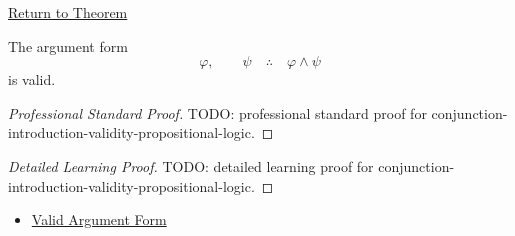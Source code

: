 \newpage
{}
\label{prf:conjunction-introduction-validity-propositional-logic}

\begin{remark*}[Return]
\hyperref[thm:conjunction-introduction-validity-propositional-logic]{Return to Theorem}
\end{remark*}

\begin{theorem*}
The argument form
\[
\varphi,\qquad \psi \quad\therefore\quad \varphi\land\psi
\]
is valid.
\end{theorem*}

\begin{proof}[Professional Standard Proof]
\LRAProofBodyStart
TODO: professional standard proof for conjunction-introduction-validity-propositional-logic.
\end{proof}

\begin{proof}[Detailed Learning Proof]
\LRAProofBodyStart
TODO: detailed learning proof for conjunction-introduction-validity-propositional-logic.
\end{proof}

\begin{remark*}
\end{remark*}

\begin{dependencies}
\begin{itemize}
  \item \hyperref[def:valid-argument-form-propositional-logic]{Valid Argument Form}
\end{itemize}
\end{dependencies}

\clearpage
